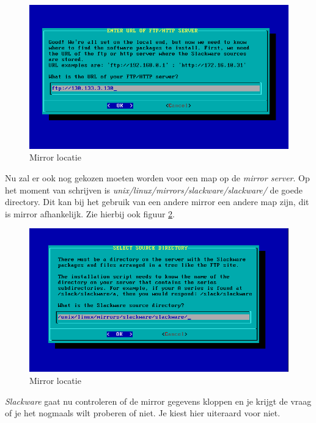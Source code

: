 \begin{figure}[H]
  \begin{center}
    \includegraphics[scale=0.5]{images/05_mirror_location}
  \end{center}
  \caption{Mirror locatie}
  \label{fig:mirror}
\end{figure}

Nu zal er ook nog gekozen moeten worden voor een map op de \emph{mirror server}. Op het moment van schrijven is \emph{unix/linux/mirrors/slackware/slackware/} de goede directory. Dit kan bij het gebruik van een andere mirror een andere map zijn, dit is mirror afhankelijk. Zie hierbij ook figuur \ref{fig:mirror2}.

\begin{figure}[H]
  \begin{center}
    \includegraphics[scale=0.5]{images/06_mirror_location_2}
  \end{center}
  \caption{Mirror locatie}
  \label{fig:mirror2}
\end{figure}
\emph{Slackware} gaat nu controleren of de mirror gegevens kloppen en je krijgt de vraag of je het nogmaals wilt proberen of niet. Je kiest hier uiteraard voor niet.

